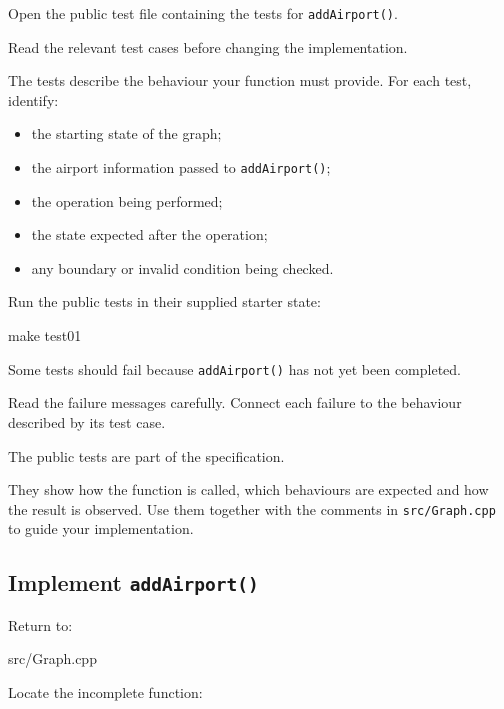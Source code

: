 \documentclass{csc2059practical}
\begin{document}
Open the public test file containing the tests for
\texttt{addAirport()}.

Read the relevant test cases before changing the implementation.

The tests describe the behaviour your function must provide. For each test,
identify:

\begin{itemize}
\item the starting state of the graph;
\item the airport information passed to \texttt{addAirport()};
\item the operation being performed;
\item the state expected after the operation;
\item any boundary or invalid condition being checked.
\end{itemize}

Run the public tests in their supplied starter state:

\begin{terminal}
make test01
\end{terminal}

Some tests should fail because \texttt{addAirport()} has not yet been
completed.

Read the failure messages carefully. Connect each failure to the behaviour
described by its test case.

\begin{tipbox}
The public tests are part of the specification.

They show how the function is called, which behaviours are expected and how the
result is observed. Use them together with the comments in
\texttt{src/Graph.cpp} to guide your implementation.
\end{tipbox}


\subsection{Implement \texttt{addAirport()}}

Return to:

\begin{terminal}
src/Graph.cpp
\end{terminal}

Locate the incomplete function:
\end{document}
